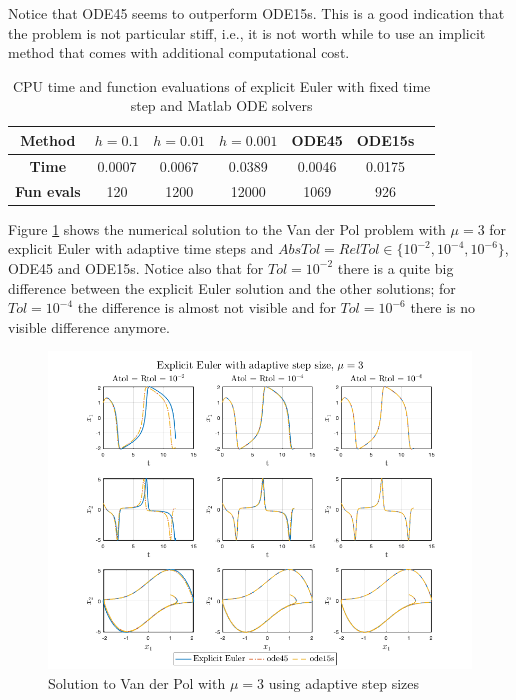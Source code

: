 Notice that ODE45 seems to outperform ODE15s. This is a good indication that the problem is not particular stiff, i.e., it is not worth while to use an implicit method that comes with additional computational cost. 

\begin{table}[H]
    \centering
    \caption{CPU time and function evaluations of explicit Euler with fixed time step and Matlab ODE solvers}
    \begin{tabular}{|c||c|c|c|c|c|c|} \hline
         \textbf{Method}    & $h=0.1$&   $h=0.01$ & $h=0.001$ & ODE45 & ODE15s     \\ \hline \hline 
         \textbf{Time}      & 0.0007 &    0.0067  &    0.0389 & 0.0046 & 0.0175   \\ \hline
         \textbf{Fun evals} & 120   & 1200 & 12000 & 1069 & 926  \\ \hline
    \end{tabular}
    \label{tab2:mu3_fixed}
\end{table}



Figure \ref{fig2:adap_mu3} shows the numerical solution to the Van der Pol problem with $\mu = 3$ for explicit Euler with adaptive time steps and $AbsTol=RelTol \in \{10^{-2}, 10^{-4}, 10^{-6}\}$, ODE45 and ODE15s. Notice also that for $Tol = 10^{-2}$ there is a quite big difference between the explicit Euler solution and the other solutions; for $Tol = 10^{-4}$ the difference is almost not visible and for $Tol = 10^{-6}$ there is no visible difference anymore.

\begin{figure}[H]
    \centering
    \includegraphics[width=\textwidth]{graphics/opg2/mu3_adap.png}
    \caption{Solution to Van der Pol with $\mu = 3$ using adaptive step sizes}
    \label{fig2:adap_mu3}
\end{figure}

